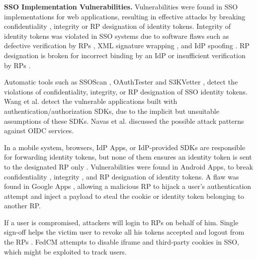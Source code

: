 \noindent\textbf{SSO Implementation Vulnerabilities.}
Vulnerabilities were found in SSO implementations for web applications,
    resulting in effective attacks %
     by breaking confidentiality \cite{WangCW12,ccsSunB12,ArmandoCCCPS13,DiscoveringJCS,dimvaLiM16}, integrity \cite{WangCW12,SomorovskyMSKJ12,WangZLG16,MainkaMS16, MainkaMSW17,dimvaLiM16} or RP designation \cite{WangZLG16,MainkaMS16,MainkaMSW17,YangLCZ18,dimvaLiM16} of identity tokens.
Integrity of identity tokens was violated in SSO systems  %
due to software flaws such as
 defective verification by RPs \cite{WangCW12,WangZLG16,MainkaMSW17}, XML signature wrapping \cite{SomorovskyMSKJ12}, and IdP spoofing \cite{MainkaMS16,MainkaMSW17}.
RP designation is broken
    for incorrect binding by an IdP \cite{YangLCZ18,WangZLG16} or insufficient verification by RPs \cite{MainkaMS16,MainkaMSW17,YangLCZ18}.

Automatic tools such as SSOScan \cite{ZhouE14}, OAuthTester \cite{YangLLZH16} and S3KVetter \cite{YangLCZ18},
detect the violations of confidentiality, integrity, or RP designation of SSO identity tokens.
Wang et al. \cite{ExplicatingSDK} detect the vulnerable applications
    built with authentication/authorization SDKs,
     due to the implicit but unsuitable assumptions of these SDKs.
Navas et al. \cite{NavasB19} discussed the possible attack patterns against OIDC services.

In a mobile system,
browsers, IdP Apps,
    or IdP-provided SDKs %
         are responsible for forwarding identity tokens, %
but none of them ensures an identity token is sent to the designated RP only \cite{ChenPCTKT14,WangZLLYLG15}.
Vulnerabilities were found in Android Apps,
    to break confidentiality \cite{ChenPCTKT14,WangZLLYLG15,YangLS17,ShiWL19}, integrity \cite{ChenPCTKT14,YangLS17}, and RP designation \cite{ChenPCTKT14,ShiWL19} of identity tokens.
A flaw was found in Google Apps \cite{ArmandoCCCPS13}, allowing a malicious RP to hijack a user's authentication attempt and inject a payload to steal the cookie or identity token belonging to another RP.

If a user is compromised,
    attackers will login to RPs on behalf of him.
Single sign-off helps the victim user
 to revoke all his tokens accepted and logout from the RPs  \cite{GhasemisharifRC18}.
FedCM \cite{FedCM} attempts to disable iframe and third-party cookies in SSO, which might be exploited to track users.

